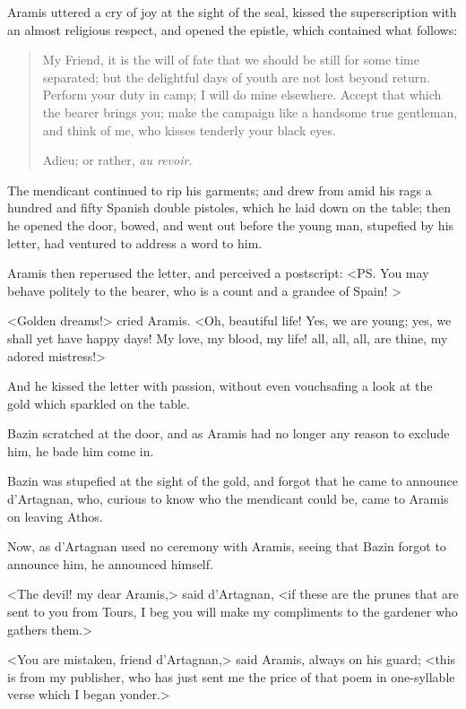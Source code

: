 Aramis uttered a cry of joy at the sight of the seal, kissed the superscription with an almost religious respect, and opened the epistle, which contained what follows:

\begin{quotation}
	My Friend, it is the will of fate that we should be still for some time separated; but the delightful days of youth are not lost beyond return. Perform your duty in camp; I will do mine elsewhere. Accept that which the bearer brings you; make the campaign like a handsome true gentleman, and think of me, who kisses tenderly your black eyes.
	
	Adieu; or rather, \textit{au revoir}.
\end{quotation}

The mendicant continued to rip his garments; and drew from amid his rags a hundred and fifty Spanish double pistoles, which he laid down on the table; then he opened the door, bowed, and went out before the young man, stupefied by his letter, had ventured to address a word to him. 

Aramis then reperused the letter, and perceived a postscript: <PS. You may behave politely to the bearer, who is a count and a grandee of Spain! >

<Golden dreams!> cried Aramis. <Oh, beautiful life! Yes, we are young; yes, we shall yet have happy days! My love, my blood, my life! all, all, all, are thine, my adored mistress!> 

And he kissed the letter with passion, without even vouchsafing a look at the gold which sparkled on the table. 

Bazin scratched at the door, and as Aramis had no longer any reason to exclude him, he bade him come in. 

Bazin was stupefied at the sight of the gold, and forgot that he came to announce d'Artagnan, who, curious to know who the mendicant could be, came to Aramis on leaving Athos. 

Now, as d'Artagnan used no ceremony with Aramis, seeing that Bazin forgot to announce him, he announced himself. 

<The devil! my dear Aramis,> said d'Artagnan, <if these are the prunes that are sent to you from Tours, I beg you will make my compliments to the gardener who gathers them.> 

<You are mistaken, friend d'Artagnan,> said Aramis, always on his guard; <this is from my publisher, who has just sent me the price of that poem in one-syllable verse which I began yonder.> 

